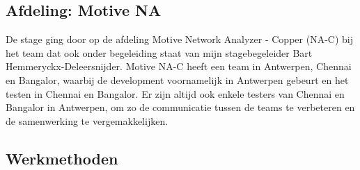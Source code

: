 \documentclass[10pt,a4paper]{article}
\begin{document}
\subsection{Afdeling: Motive NA}
De stage ging door op de afdeling Motive Network Analyzer - Copper (NA-C) bij het team dat ook onder begeleiding staat van mijn stagebegeleider Bart Hemmeryckx-Deleersnijder. Motive NA-C heeft een team in Antwerpen, Chennai en Bangalor, waarbij de development voornamelijk in Antwerpen gebeurt en het testen in Chennai en Bangalor. Er zijn altijd ook enkele testers van Chennai en Bangalor in Antwerpen, om zo de communicatie tussen de teams te verbeteren en de samenwerking te vergemakkelijken.
\subsection{Werkmethoden}
\end{document}
